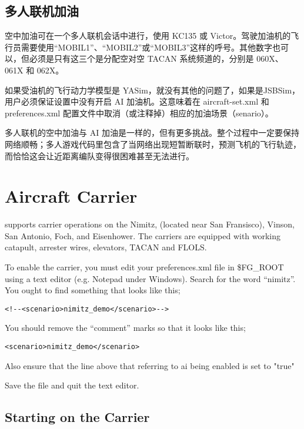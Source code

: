 \subsection{多人联机加油}

空中加油可在一个多人联机会话中进行，使用 KC135 或 Victor。驾驶加油机的飞行员需要使用“MOBIL1”、“MOBIL2”或“MOBIL3”这样的呼号。其他数字也可以，但必须是只有这三个是分配空对空 TACAN 系统频道的，分别是 060X、061X 和 062X。

如果受油机的飞行动力学模型是 YASim，就没有其他的问题了，如果是JSBSim，用户必须保证设置中没有开启 AI 加油机。这意味着在 aircraft-set.xml 和 preferences.xml 配置文件中取消（或注释掉）相应的加油场景（senario）。

多人联机的空中加油与 AI 加油是一样的，但有更多挑战。整个过程中一定要保持网络顺畅；多人游戏代码里包含了当网络出现短暂断联时，预测飞机的飞行轨迹，而恰恰这会让近距离编队变得很困难甚至无法进行。

\fi

\iffalse
\section{Aircraft Carrier}\label{carrier}

\FlightGear{} supports carrier operations on the Nimitz, (located near San Fransisco), Vinson, San Antonio, Foch, and Eisenhower.
The carriers are equipped with working catapult, arrester wires, elevators, TACAN and FLOLS.

To enable the carrier, you must edit your preferences.xml file in \$FG\_ROOT using a text editor (e.g. Notepad
under Windows). Search for the word ``nimitz''. You ought to find something that looks like this;

\begin{verbatim}
<!--<scenario>nimitz_demo</scenario>-->
\end{verbatim}

You should remove the ``comment'' marks so that it looks like this;


\begin{verbatim}
<scenario>nimitz_demo</scenario>
\end{verbatim}

Also ensure that the line above that referring to ai being enabled is set to "true"

Save the file and quit the text editor.

\subsection{Starting on the Carrier}

